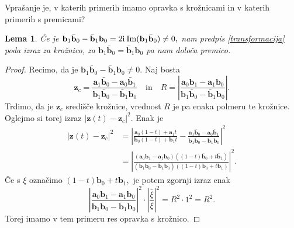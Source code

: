 \documentclass[12pt,a4paper,twoside]{article}
\newcommand{\iu}{\mathrm{i}\mkern1mu} %
\theoremstyle{definition} %
\theoremstyle{plain} %
\newtheorem{lema}[definicija]{Lema}
\theoremstyle{primerstyle}
\numberwithin{equation}{section}  %
\newcommand{\aV}{\mathbf{a}}
\newcommand{\bV}{\mathbf{b}}
\newcommand{\zV}{\mathbf{z}}
\DeclareMathOperator{\ImC}{Im}
\begin{document}
Vprašanje je, v katerih primerih imamo opravka s krožnicami in v katerih primerih s premicami?
\begin{lema}
	\label{z_kroznica_premica}
	Če je $\bV_1\bar{\bV}_0-\bar{\bV}_1\bV_0=2\iu\ImC(\bV_1\bar{\bV}_0)\neq 0,$ nam predpis \eqref{transformacija} poda izraz za krožnico, za $\bV_1\bar{\bV}_0=\bar{\bV}_1\bV_0$ pa nam določa premico.
\end{lema}
\begin{proof}
	Recimo, da je $\bV_1\bar{\bV}_0-\bar{\bV}_1\bV_0\neq 0$. Naj bosta
	\begin{equation*}
		\zV_c=\frac{\aV_1\bar{\bV}_0-\aV_0\bar{\bV}_1}{\bV_1\bar{\bV}_0-\bar{\bV}_1\bV_0}\quad\text{in}\quad R=\left|\frac{\aV_0\bV_1-\aV_1\bV_0}{\bV_1\bar{\bV}_0-\bar{\bV}_1\bV_0}\right|.
	\end{equation*}
	Trdimo, da je $\zV_c$ središče krožnice, vrednost $R$ je pa enaka polmeru te krožnice. Oglejmo si torej izraz $|\zV(t)-\zV_c|^2.$ Enak je
	\begin{align*}
		|\zV(t)-\zV_c|^2&=\left|\frac{\aV_0(1-t)+\aV_1t}{\bV_0(1-t)+\bV_1t}-\frac{\aV_1\bar{\bV}_0-\aV_0\bar{\bV}_1}{\bV_1\bar{\bV}_0-\bar{\bV}_1\bV_0}\right|^2\\
		&=\left|\frac{(\aV_0\bV_1-\aV_1\bV_0)((1-t)\bar{\bV}_0+t\bar{\bV}_1)}{(\bV_1\bar{\bV}_0-\bar{\bV}_1\bV_0)((1-t)\bV_0+t\bV_1)}\right|^2.
	\end{align*}
	Če s $\xi$ označimo $(1-t)\bV_0+t\bV_1,$ je potem zgornji izraz enak
	\begin{equation*}
		\left|\frac{\aV_0\bV_1-\aV_1\bV_0}{\bV_1\bar{\bV}_0-\bar{\bV}_1\bV_0}\right|^2\cdot\left|\frac{\bar{\xi}}{\xi}\right|^2=R^2\cdot1^2=R^2.
	\end{equation*}
	Torej imamo v tem primeru res opravka s krožnico.


\end{proof}
\end{document}
